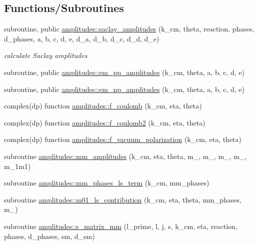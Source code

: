 \subsection*{Functions/\+Subroutines}
\begin{DoxyCompactItemize}
\item 
subroutine, public \hyperlink{namespaceamplitudes_a2c13b08b9114f55d796fa0ad76fb1afd}{amplitudes\+::saclay\+\_\+amplitudes} (k\+\_\+cm, theta, reaction, phases, d\+\_\+phases, a, b, c, d, e, d\+\_\+a, d\+\_\+b, d\+\_\+c, d\+\_\+d, d\+\_\+e)
\begin{DoxyCompactList}\small\item\em calculate Saclay amplitudes \end{DoxyCompactList}\item 
subroutine, public \hyperlink{namespaceamplitudes_aca98c489bfb460150de74e01455194c6}{amplitudes\+::em\+\_\+pp\+\_\+amplitudes} (k\+\_\+cm, theta, a, b, c, d, e)
\item 
subroutine, public \hyperlink{namespaceamplitudes_a1ecc7462b112cd7709e06658b50bcf68}{amplitudes\+::em\+\_\+np\+\_\+amplitudes} (k\+\_\+cm, theta, a, b, c, d, e)
\item 
complex(dp) function \hyperlink{namespaceamplitudes_a15d06fdbb253231f6ba809a11be4bc0c}{amplitudes\+::f\+\_\+coulomb} (k\+\_\+cm, eta, theta)
\item 
complex(dp) function \hyperlink{namespaceamplitudes_a1deb8553133d2a765c200dddc6d4019e}{amplitudes\+::f\+\_\+coulomb2} (k\+\_\+cm, eta, theta)
\item 
complex(dp) function \hyperlink{namespaceamplitudes_aeefee706538ec9db13783ca6bf39139c}{amplitudes\+::f\+\_\+vacuum\+\_\+polarization} (k\+\_\+cm, eta, theta)
\item 
subroutine \hyperlink{namespaceamplitudes_a4c67568b324f005039a7a4a10fbfad32}{amplitudes\+::mm\+\_\+amplitudes} (k\+\_\+cm, eta, theta, m\+\_, m\+\_, m\+\_, m\+\_, m\+\_\+1m1)
\item 
subroutine \hyperlink{namespaceamplitudes_a3b59e51fa3e5cbeac091c86fa86b0005}{amplitudes\+::mm\+\_\+phases\+\_\+ls\+\_\+term} (k\+\_\+cm, mm\+\_\+phases)
\item 
subroutine \hyperlink{namespaceamplitudes_ac2fb8ddf880b4a5d9dd1d941ee9a9713}{amplitudes\+::m01\+\_\+ls\+\_\+contribution} (k\+\_\+cm, eta, theta, mm\+\_\+phases, m\+\_)
\item 
subroutine \hyperlink{namespaceamplitudes_aefff90f83f922023f8bd5a617b88fcaa}{amplitudes\+::s\+\_\+matrix\+\_\+mm} (l\+\_\+prime, l, j, s, k\+\_\+cm, eta, reaction, phases, d\+\_\+phases, sm, d\+\_\+sm)

\end{DoxyCompactItemize}
